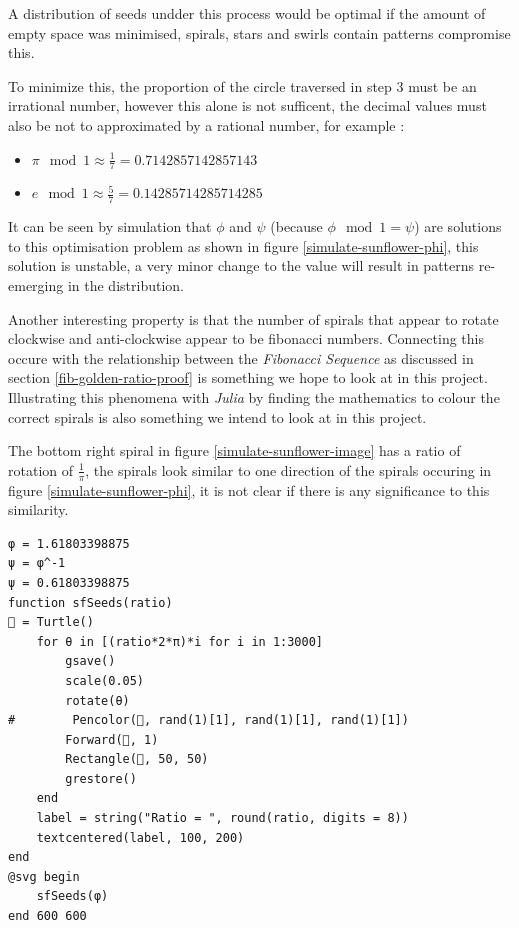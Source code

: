 \documentclass[11pt]{article}
\begin{document}
A distribution of seeds undder this process would be optimal if the amount of empty space was minimised, spirals, stars and swirls contain patterns compromise this.

To minimize this, the proportion of the circle traversed in step 3 must be an
irrational number, however this alone is not sufficent, the decimal values must
also be not to approximated by a rational number, for example
\cite{NatureGoldenRatio2018}:

\begin{itemize}
\item \(\pi \mod 1 \approx \frac{1}{7}=0.7142857142857143\)
\item \(e \mod 1 \approx \frac{5}{7}= 0.14285714285714285\)
\end{itemize}

It can be seen by simulation that \(\phi\) and \(\psi\) (because \(\phi \mod 1 =
\psi\)) are solutions to this optimisation problem as shown in figure
\ref{simulate-sunflower-phi}, this solution is unstable, a very minor change to the
value will result in patterns re-emerging in the distribution.

Another interesting property is that the number of spirals that appear to rotate
clockwise and anti-clockwise appear to be fibonacci numbers. Connecting this
occure with the relationship between the \emph{Fibonacci Sequence} as discussed in
section \ref{fib-golden-ratio-proof} is something we hope to look at in this project.
Illustrating this phenomena with \emph{Julia} by finding the mathematics to colour
the correct spirals is also something we intend to look at in this project.

The bottom right spiral in figure \ref{simulate-sunflower-image} has a ratio of rotation of \(\frac{1}{\pi}\), the spirals look similar to one direction of the spirals occuring in figure \ref{simulate-sunflower-phi}, it is not clear if there is any significance to this similarity.

\begin{lstlisting}
φ = 1.61803398875
ψ = φ^-1
ψ = 0.61803398875
function sfSeeds(ratio)
🐢 = Turtle()
    for θ in [(ratio*2*π)*i for i in 1:3000]
        gsave()
        scale(0.05)
        rotate(θ)
#        Pencolor(🐢, rand(1)[1], rand(1)[1], rand(1)[1])
        Forward(🐢, 1)
        Rectangle(🐢, 50, 50)
        grestore()
    end
    label = string("Ratio = ", round(ratio, digits = 8))
    textcentered(label, 100, 200)
end
@svg begin
    sfSeeds(φ)
end 600 600
\end{lstlisting}
\end{document}
